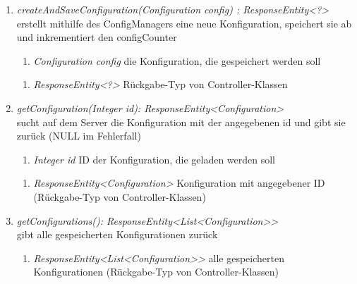 \begin{enumerate}[+]
	\item \textit{ createAndSaveConfiguration(Configuration config) : ResponseEntity<?> } \\
	erstellt mithilfe des ConfigManagers eine neue Konfiguration, speichert sie ab und inkrementiert den configCounter
	
	\begin{enumerate}[$\bullet$]
		\item \textit{Configuration config} die Konfiguration, die gespeichert werden soll
	\end{enumerate}
	\vspace{-0.2cm}
	\begin{enumerate}[$\circ$]
		\item \textit{ResponseEntity<?>} Rückgabe-Typ von Controller-Klassen
	\end{enumerate}
	
		\item \textit{ getConfiguration(Integer id): ResponseEntity<Configuration> }\\
		sucht auf dem Server die Konfiguration mit der angegebenen id und gibt sie zurück (NULL im Fehlerfall)
	
	\begin{enumerate}[$\bullet$]
		\item \textit{Integer id} ID der Konfiguration, die geladen werden soll
		
	\end{enumerate}
	\vspace{-0.2cm}
	\begin{enumerate}[$\circ$]
		\item \textit{ResponseEntity<Configuration>} Konfiguration mit angegebener ID (Rückgabe-Typ von Controller-Klassen)
	\end{enumerate}
	\item \textit{ getConfigurations(): ResponseEntity<List<Configuration>> }\\
	gibt alle gespeicherten Konfigurationen zurück
	
	\begin{enumerate}[$\circ$]
		\item \textit{ResponseEntity<List<Configuration>>} alle gespeicherten Konfigurationen (Rückgabe-Typ von Controller-Klassen)
	\end{enumerate}
\end{enumerate}